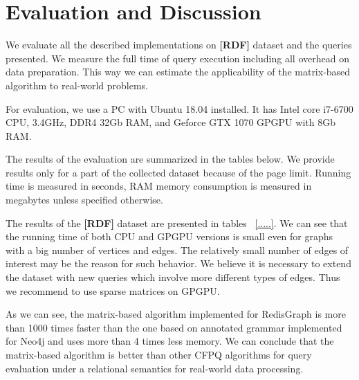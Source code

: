 \section{Evaluation and Discussion}

We evaluate all the described implementations on \textbf{[RDF]} dataset and the queries presented.
We measure the full time of query execution including all overhead on data preparation.
This way we can estimate the applicability of the matrix-based algorithm to real-world problems.

For evaluation, we use a PC with Ubuntu 18.04 installed.
It has Intel core i7-6700 CPU, 3.4GHz, DDR4 32Gb RAM, and Geforce GTX 1070 GPGPU with 8Gb RAM.

The results of the evaluation are summarized in the tables below.
We provide results only for a part of the collected dataset because of the page limit.
Running time is measured in seconds, RAM memory consumption is measured in megabytes unless specified otherwise.

The results of the \textbf{[RDF]} dataset are presented in tables ~\ref{.....}.
We can see that the running time of both CPU and GPGPU versions is small even for graphs with a big number of vertices and edges.
The relatively small number of edges of interest may be the reason for such behavior.
We believe it is necessary to extend the dataset with new queries which involve more different types of edges.
Thus we recommend to use sparse matrices on GPGPU.


As we can see, the matrix-based algorithm implemented for RedisGraph is more than 1000 times faster than the one based on annotated grammar implemented for Neo4j and uses more than 4 times less memory.
We can conclude that the matrix-based algorithm is better than other CFPQ algorithms for query evaluation under a relational semantics for real-world data processing.

